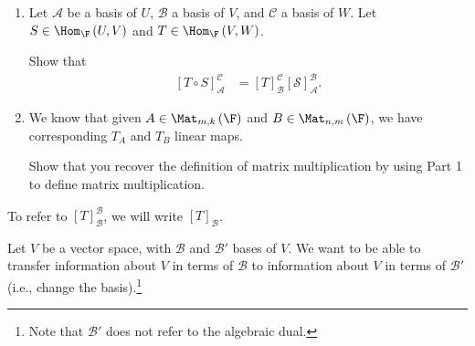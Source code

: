 \documentclass[10pt]{mypackage}
\begin{document}
\begin{exercise}\hfill
  \begin{enumerate}[(1)]
    \item Let $\mathcal{A}$ be a basis of $U$, $\mathcal{B}$ a basis of $V$, and $\mathcal{C}$ a basis of $W$. Let $S\in\Hom_{\F}\left(U,V\right)$ and $T\in\Hom_{\F}\left(V,W\right)$.\newline

  Show that
  \begin{align*}
    \left[T\circ S\right]_{\mathcal{A}}^{\mathcal{C}} &= \left[T\right]_{\mathcal{B}}^{\mathcal{C}}\left[\mathcal{S}\right]_{\mathcal{A}}^{\mathcal{B}}.
  \end{align*}
  \item We know that given $A\in \Mat_{m,k}\left(\F\right)$ and $B\in \Mat_{n,m}\left(\F\right)$, we have corresponding $T_A$ and $T_B$ linear maps.\newline

  Show that you recover the definition of matrix multiplication by using Part 1 to define matrix multiplication.
  \end{enumerate}
  \end{exercise}
  \begin{note}
    To refer to $\left[T\right]_{\mathcal{B}}^{\mathcal{B}}$, we will write $\left[T\right]_{\mathcal{B}}$.
  \end{note}
  Let $V$ be a vector space, with $\mathcal{B}$ and $\mathcal{B}'$ bases of $V$. We want to be able to transfer information about $V$ in terms of $\mathcal{B}$ to information about $V$ in terms of $\mathcal{B}'$ (i.e., change the basis).\footnote{Note that $\mathcal{B}'$ does not refer to the algebraic dual.}\newline
\end{document}
